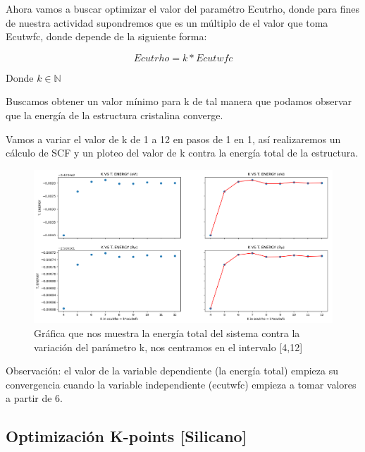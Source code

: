 \vspace{0.5cm}

Ahora vamos a buscar optimizar el valor del paramétro Ecutrho, donde para fines de nuestra actividad 
supondremos que es un múltiplo de el valor que toma Ecutwfc, donde depende de la siguiente forma:

\begin{equation*}
    Ecutrho = k*Ecutwfc
\end{equation*}

Donde $ k \in \mathbb{N}  $

\vspace{0.5cm}

Buscamos obtener un valor mínimo para k de tal manera que podamos observar que la energía de la
estructura cristalina converge.

\vspace{0.5cm}

Vamos a variar el valor de k de 1 a 12 en pasos de 1 en 1, así realizaremos un cálculo de
SCF y un ploteo del valor de k contra la energía total de la estructura.

\begin{figure}[H]
    \centering
    \includegraphics[scale=0.33]{images_silicano/K_in_ecutrho_vs_Energy.png}
    \caption{Gráfica que nos muestra la energía total del sistema contra la variación del parámetro k, nos centramos en el intervalo [4,12]}
\end{figure}

Observación: el valor de la variable dependiente (la energía total) empieza su convergencia cuando 
la variable independiente (ecutwfc) empieza a tomar valores a partir de 6.



\newpage

\subsection{Optimización K-points [Silicano]}

